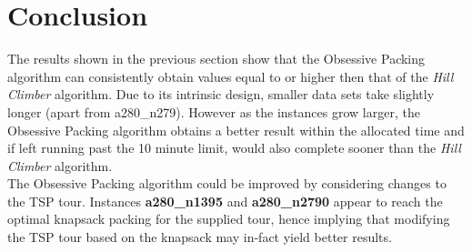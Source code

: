 \documentclass[a4paper,12pt]{article}
\begin{document}
\newpage
\section{Conclusion}
The results shown in the previous section show that the Obsessive Packing algorithm can consistently obtain values equal to or higher then that of the \textit{Hill Climber} algorithm. Due to its intrinsic design, smaller data sets take slightly longer (apart from a280\_n279). However as the instances grow larger,  the Obsessive Packing algorithm obtains a better result within the allocated time and if left running past the 10 minute limit, would also complete sooner than the \textit{Hill Climber} algorithm.\\

The Obsessive Packing algorithm could be improved by considering changes to the TSP tour. Instances {\bf a280\_n1395} and {\bf a280\_n2790} appear to reach the optimal knapsack packing for the supplied tour, hence implying that modifying the TSP tour based on the knapsack may in-fact yield better results.
\end{document}
